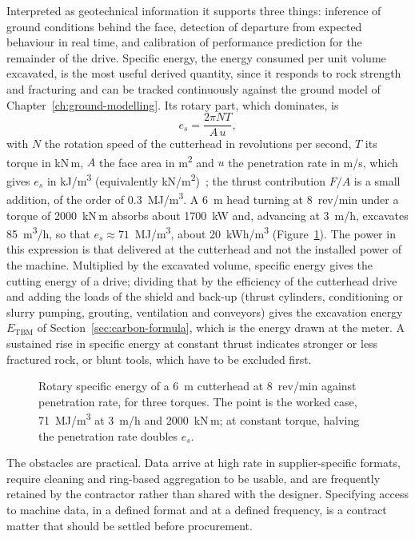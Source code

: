 Interpreted as geotechnical information it supports three things: inference of
ground conditions behind the face, detection of departure from expected
behaviour in real time, and calibration of performance prediction for the
remainder of the drive. Specific energy, the energy consumed per unit
volume excavated, is the most useful derived quantity, since it responds to
rock strength and fracturing and can be tracked continuously against the ground
model of Chapter~\ref{ch:ground-modelling}. Its rotary part, which dominates,
is
\[
e_s = \frac{2\pi N T}{A\,u} ,
\]
with $N$ the rotation speed of the cutterhead in revolutions per second, $T$
its torque in kN\,m, $A$ the face area in m\textsuperscript{2} and $u$ the
penetration rate in m/s, which gives $e_s$ in kJ/m\textsuperscript{3}
(equivalently kN/m\textsuperscript{2})~\citep{teale1965specific}; the thrust
contribution $F/A$ is a small addition, of the order of
0.3~MJ/m\textsuperscript{3}. A 6~m head turning at 8~rev/min under a torque
of 2000~kN\,m absorbs about 1700~kW and, advancing at 3~m/h, excavates
85~m\textsuperscript{3}/h, so that $e_s \approx 71$~MJ/m\textsuperscript{3},
about 20~kWh/m\textsuperscript{3} (Figure~\ref{fig:specific-energy}). The power in this expression is that
delivered at the cutterhead and not the installed power of the machine.
Multiplied by the excavated volume, specific energy gives the cutting energy
of a drive; dividing that by the efficiency of the cutterhead drive and adding
the loads of the shield and back-up (thrust cylinders, conditioning or
slurry pumping, grouting, ventilation and conveyors) gives the excavation
energy $E_{\mathrm{TBM}}$ of Section~\ref{sec:carbon-formula}, which is the
energy drawn at the meter. A sustained rise in specific energy at
constant thrust indicates stronger or less fractured rock, or blunt tools,
which have to be excluded first.

\begin{figure}[htbp]
\centering
{}
\caption{Rotary specific energy of a 6~m cutterhead at 8~rev/min against penetration rate, for three torques. The point is the worked case, 71~MJ/m\textsuperscript{3} at 3~m/h and 2000~kN\,m; at constant torque, halving the penetration rate doubles $e_s$.}
\label{fig:specific-energy}
\end{figure}

The obstacles are practical. Data arrive at high rate in supplier-specific
formats, require cleaning and ring-based aggregation to be usable, and are
frequently retained by the contractor rather than shared with the designer.
Specifying access to machine data, in a defined format and at a defined
frequency, is a contract matter that should be settled before procurement.

